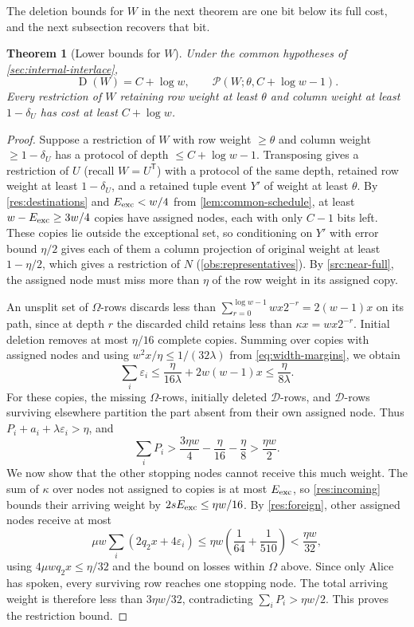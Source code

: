 \documentclass[11pt,letterpaper]{article} \usepackage[utf8]{inputenc}
\theoremstyle{plain} \newtheorem{theorem}{Theorem}[section]
\theoremstyle{definition} \newaliascnt{definition}{theorem}
\newcommand{\D}{\operatorname{D}}
\newcommand{\RP}[3]{\mathcal{P}(#1;#2,#3)}
\begin{document}
The deletion bounds for $W$ in the next theorem are one bit below its full cost,
and the next subsection recovers that bit.

\begin{theorem}[Lower bounds for $W$]\label{res:alignment}
Under the common hypotheses of \cref{sec:internal-interlace},
\[
 \D(W)=C+\log w,\qquad \RP{W}{\theta}{C+\log w-1}.
\]
Every restriction of $W$ retaining row weight at least $\theta$ and column
weight at least $1-\delta_U$ has cost at least $C+\log w$.
\end{theorem}
\begin{proof}
Suppose a restriction of $W$ with row weight $\ge\theta$ and column
weight $\ge1-\delta_U$ has a protocol of depth $\le C+\log w-1$.
Transposing gives a restriction of $U$ (recall $W=U^{\mathsf T}$) with a protocol of the same depth,
retained row weight at least $1-\delta_U$, and a retained tuple event $Y'$ of weight at least $\theta$.
By \cref{res:destinations} and $E_{\rm exc}<w/4$ from \cref{lem:common-schedule},
at least $w-E_{\rm exc}\ge3w/4$ copies
have assigned nodes, each with only $C-1$ bits left. These copies lie outside
the exceptional set, so conditioning on $Y'$ with
error bound $\eta/2$ gives each of them a column projection of original
weight at least $1-\eta/2$, which gives a restriction of $N$
(\cref{obs:representatives}). By \cref{src:near-full}, the assigned node must miss more than
$\eta$ of the row weight in its assigned copy.

An unsplit set of $\Omega$-rows discards less than
$\sum_{r=0}^{\log w-1}wx2^{-r}=2(w-1)x$ on its path, since at depth $r$
the discarded child retains less than $\kappa x=wx2^{-r}$.
Initial deletion removes at most $\eta/16$ complete copies. Summing over copies
with assigned nodes and using $w^2x/\eta\le1/(32\lambda)$ from
\eqref{eq:width-margins}, we obtain
\[
 \sum_i\varepsilon_i\le\frac{\eta}{16\lambda}+2w(w-1)x
 \le\frac{\eta}{8\lambda}.
\]
For these copies, the missing $\Omega$-rows, initially
deleted $\mathcal D$-rows, and $\mathcal D$-rows surviving elsewhere partition
the part absent from their own assigned node. Thus
$P_i+a_i+\lambda\varepsilon_i>\eta$, and
\[
\sum_iP_i>\frac{3\eta w}{4}-\frac{\eta}{16}-\frac{\eta}{8}
>\frac{\eta w}{2}.
\]
We now show that the other stopping nodes cannot receive this much weight. The sum of $\kappa$
over nodes not assigned to copies is at most $E_{\rm exc}$, so
\cref{res:incoming} bounds their arriving
weight by $2sE_{\rm exc}\le\eta w/16$. By \cref{res:foreign}, other assigned nodes receive
at most
\[
\mu w\sum_i(2q_2x+4\varepsilon_i)
\le\eta w\left(\frac1{64}+\frac1{510}\right)<\frac{\eta w}{32},
\]
using $4\mu wq_2x\le\eta/32$ and the bound on losses within $\Omega$ above.
Since only Alice has spoken, every surviving row reaches one stopping node.
The total arriving weight is therefore less than $3\eta w/32$, contradicting
$\sum_iP_i>\eta w/2$. This proves the restriction bound.


\end{proof}
\end{document}
